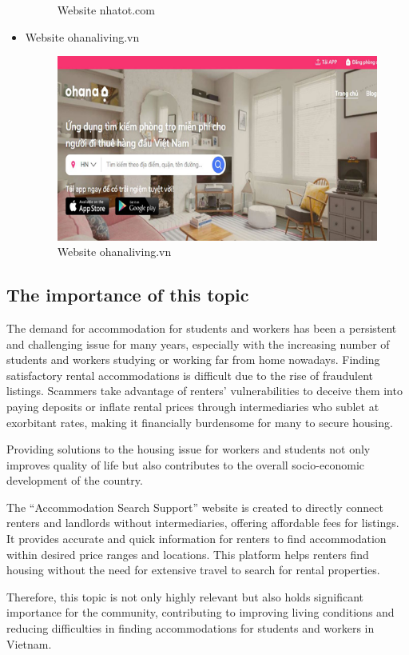 \documentclass[../Main.tex]{subfiles}
\begin{document}
\begin{itemize}
\begin{figure}[H]
              \caption{Website nhatot.com}
              \label{fig:nhatot}
          \end{figure}
    \item Website ohanaliving.vn
          \begin{figure}[H]
              \centering
              \includegraphics[width=\textwidth]{Figure/Picture3.png}
              \caption{Website ohanaliving.vn}
              \label{fig:ohanaliving}
          \end{figure}
\end{itemize}

\subsection{The importance of this topic}

The demand for accommodation for students and workers has been a persistent and challenging issue for many years, especially with the increasing number of students and workers studying or working far from home nowadays.
Finding satisfactory rental accommodations is difficult due to the rise of fraudulent listings.
Scammers take advantage of renters' vulnerabilities to deceive them into paying deposits or inflate rental prices through intermediaries who sublet at exorbitant rates, making it financially burdensome for many to secure housing.

Providing solutions to the housing issue for workers and students not only improves quality of life but also contributes to the overall socio-economic development of the country.

The ``Accommodation Search Support'' website is created to directly connect renters and landlords without intermediaries, offering affordable fees for listings.
It provides accurate and quick information for renters to find accommodation within desired price ranges and locations.
This platform helps renters find housing without the need for extensive travel to search for rental properties.

Therefore, this topic is not only highly relevant but also holds significant importance for the community, contributing to improving living conditions and reducing difficulties in finding accommodations for students and workers in Vietnam.
\end{document}
